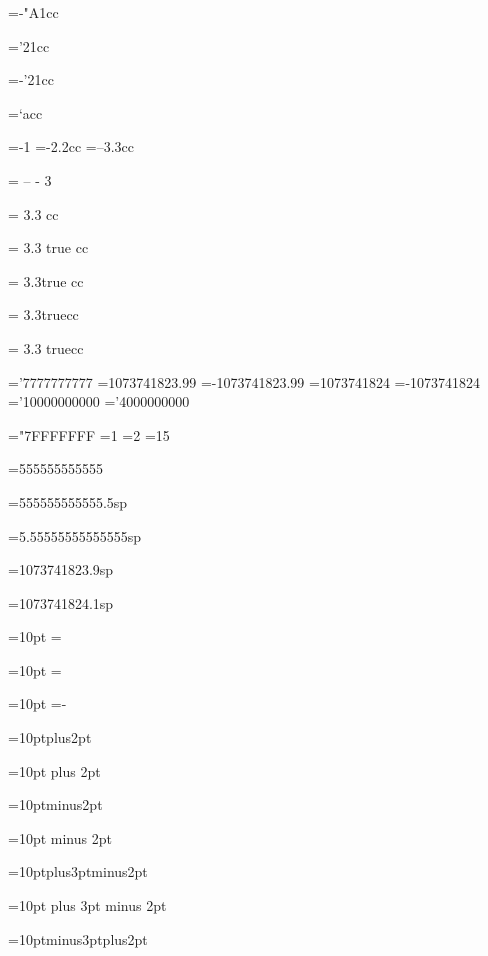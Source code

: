 =-"A1cc
\showthe{}

='21cc
\showthe{}

=-'21cc
\showthe{}

=`acc
\showthe{}

=-1
\showthe{}
=-2.2cc
\showthe{}
=--3.3cc
\showthe{}

  =  -- - 3  
\showthe{}

 = 3.3  cc
\showthe{}

 = 3.3 true cc
\showthe{}

 = 3.3true cc
\showthe{}

 = 3.3truecc
\showthe{}

 = 3.3 truecc
\showthe{}

='7777777777
\showthe{}
=1073741823.99
\showthe{}
=-1073741823.99
\showthe{}
=1073741824
\showthe{}
=-1073741824
\showthe{}
='10000000000
\showthe{}
='4000000000
\showthe{}

="7FFFFFFF
=1
\showthe{}
=2
\showthe{}
=15
\showthe{}

=555555555555
\showthe{}

=555555555555.5sp
\showthe{}

=5.55555555555555sp
\showthe{}

=1073741823.9sp
\showthe{}

=1073741824.1sp
\showthe{}

=10pt
=\relax\relax
\showthe{}

=10pt
=\relax
\showthe{}

=10pt
=-\relax
\showthe{}

=10ptplus2pt
\showthe{}

=10pt plus 2pt
\showthe{}

=10ptminus2pt
\showthe{}

=10pt minus 2pt
\showthe{}

=10ptplus3ptminus2pt
\showthe{}

=10pt plus 3pt minus 2pt
\showthe{}

=10ptminus3ptplus2pt
\showthe{}

